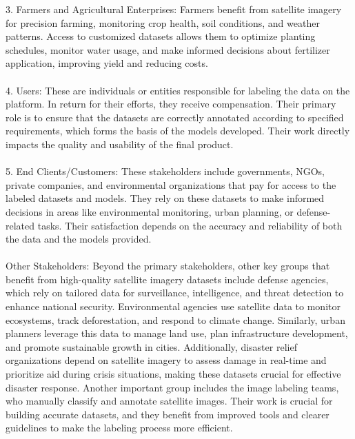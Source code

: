 \documentclass{article}
\begin{document}
3.	Farmers and Agricultural Enterprises: Farmers benefit from satellite imagery for precision farming, monitoring crop health, soil conditions, and weather patterns. Access to customized datasets allows them to optimize planting schedules, monitor water usage, and make informed decisions about fertilizer application, improving yield and reducing costs. \\
\\

4.	Users: These are individuals or entities responsible for labeling the data on the platform. In return for their efforts, they receive compensation. Their primary role is to ensure that the datasets are correctly annotated according to specified requirements, which forms the basis of the models developed. Their work directly impacts the quality and usability of the final product. \\
\\

5.	End Clients/Customers: These stakeholders include governments, NGOs, private companies, and environmental organizations that pay for access to the labeled datasets and models. They rely on these datasets to make informed decisions in areas like environmental monitoring, urban planning, or defense-related tasks. Their satisfaction depends on the accuracy and reliability of both the data and the models provided. \\
\\


Other Stakeholders: Beyond the primary stakeholders, other key groups that benefit from high-quality satellite imagery datasets include defense agencies, which rely on tailored data for surveillance, intelligence, and threat detection to enhance national security. Environmental agencies use satellite data to monitor ecosystems, track deforestation, and respond to climate change. Similarly, urban planners leverage this data to manage land use, plan infrastructure development, and promote sustainable growth in cities. Additionally, disaster relief organizations depend on satellite imagery to assess damage in real-time and prioritize aid during crisis situations, making these datasets crucial for effective disaster response. Another important group includes the image labeling teams, who manually classify and annotate satellite images. Their work is crucial for building accurate datasets, and they benefit from improved tools and clearer guidelines to make the labeling process more efficient.
\\
\end{document}

